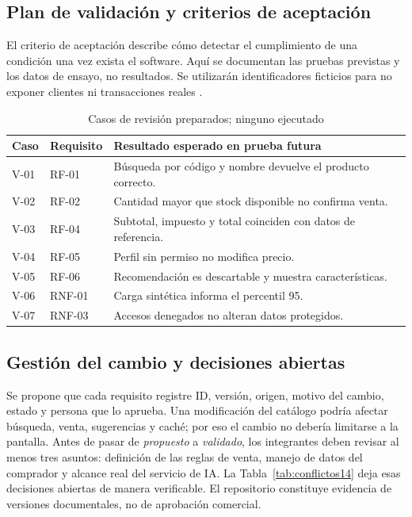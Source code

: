 \subsection{Plan de validación y criterios de aceptación}
El criterio de aceptación describe cómo detectar el cumplimiento de una condición una vez exista el software. Aquí se documentan las pruebas previstas y los datos de ensayo, no resultados. Se utilizarán identificadores ficticios para no exponer clientes ni transacciones reales \cite{iso29148,ferrari2022}.
\begin{table}[!ht]
\centering\scriptsize
\caption{Casos de revisión preparados; ninguno ejecutado}
\label{tab:pruebas14}
\begin{tabularx}{\columnwidth}{@{}P{0.65cm}P{0.73cm}Y@{}}
\toprule Caso & Requisito & Resultado esperado en prueba futura\\\midrule
V-01 & RF-01 & Búsqueda por código y nombre devuelve el producto correcto.\\
V-02 & RF-02 & Cantidad mayor que stock disponible no confirma venta.\\
V-03 & RF-04 & Subtotal, impuesto y total coinciden con datos de referencia.\\
V-04 & RF-05 & Perfil sin permiso no modifica precio.\\
V-05 & RF-06 & Recomendación es descartable y muestra características.\\
V-06 & RNF-01 & Carga sintética informa el percentil 95.\\
V-07 & RNF-03 & Accesos denegados no alteran datos protegidos.\\
\bottomrule
\end{tabularx}
\end{table}

\subsection{Gestión del cambio y decisiones abiertas}
Se propone que cada requisito registre ID, versión, origen, motivo del cambio, estado y persona que lo aprueba. Una modificación del catálogo podría afectar búsqueda, venta, sugerencias y caché; por eso el cambio no debería limitarse a la pantalla. Antes de pasar de \emph{propuesto} a \emph{validado}, los integrantes deben revisar al menos tres asuntos: definición de las reglas de venta, manejo de datos del comprador y alcance real del servicio de IA. La Tabla~\ref{tab:conflictos14} deja esas decisiones abiertas de manera verificable. El repositorio constituye evidencia de versiones documentales, no de aprobación comercial.
